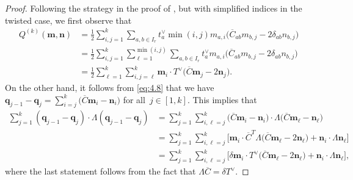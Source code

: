 \documentclass[10pt,a4paper]{amsart}
\numberwithin{equation}{section}
\begin{document}
\begin{proof}
Following the strategy in the proof of \cite[Lemma 4.2]{Lin21}, but with simplified indices in the twisted case, we first observe that
\begin{align*}
Q^{(k)}(\mathbf{m},\mathbf{n})
&=\frac{1}{2}\sum_{i,j=1}^k\sum_{a,b\in I_r} t_a^{\vee}\min(i,j)m_{a,i}\bigl(\overline{C}_{a b}m_{b,j}-2\delta_{ab}n_{b,j}\bigr)\\
&=\frac{1}{2}\sum_{i,j=1}^k\sum_{\ell=1}^{\min(i,j)}\sum_{ a,b\in I_r}t_a^{\vee}m_{a,i}\bigl(\overline{C}_{ab}m_{b,j}-2\delta_{ab}n_{b,j}\bigr)\\
&=\frac{1}{2}\sum_{\ell=1}^k\sum_{i,j=\ell}^k\mathbf{m}_i\cdot T^{\vee}\bigl(\overline{C}\mathbf{m}_j-2\mathbf{n}_j\bigr).
\end{align*}
On the other hand, it follows from \eqref{eq:4.8} that we have
$
\mathbf{q}_{j-1}-\mathbf{q}_j =\sum_{i=j}^k\bigl(\overline{C}\mathbf{m}_i-\mathbf{n}_i\bigr)
$
for all~${j\in[1,k]}$. This implies that
\begin{align*}
\sum_{j=1}^k(\mathbf{q}_{j-1}-\mathbf{q}_j)\cdot \Lambda(\mathbf{q}_{j-1}-\mathbf{q}_j)
&=\sum_{j=1}^k\sum_{i,\ell=j}^k\bigl(\overline{C}\mathbf{m}_i-\mathbf{n}_i\bigr)\cdot\Lambda\bigl(\overline{C}\mathbf{m}_{\ell}-\mathbf{n}_{\ell}\bigr)\\
&=\sum_{j=1}^k\sum_{i,\ell=j}^k\bigl[\mathbf{m}_i\cdot \overline{C}^T\Lambda\bigl(\overline{C}\mathbf{m}_{\ell}-2\mathbf{n}_{\ell}\bigr)+\mathbf{n}_i\cdot\Lambda\mathbf{n}_{\ell}\bigr]\\
&=\sum_{j=1}^k\sum_{i,\ell=j}^k\bigl[\delta\mathbf{m}_i\cdot T^{\vee}\bigl(\overline{C}\mathbf{m}_{\ell}-2\mathbf{n}_{\ell}\bigr) +\mathbf{n}_i\cdot\Lambda\mathbf{n}_{\ell}\bigr],
\end{align*}
where the last statement follows from the fact that $\Lambda\overline{C}=\delta T^{\vee}$.
\end{proof}
\end{document}
